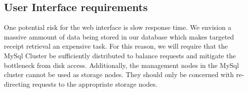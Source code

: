 \subsection{User Interface requirements}
\label{sec:requirements.interface}

One potential risk for the web interface is slow response time.  We envision a massive ammount of data being stored in our database which makes targeted receipt retrieval an expensive task.  For this reason, we will require that the MySql Cluster be sufficiently distributed to balance requests and mitigate the bottleneck from disk access.  Additionally, the management nodes in the MySql cluster cannot be used as storage nodes.  They should only be concerned with re-directing requests to the appropriate storage nodes.
